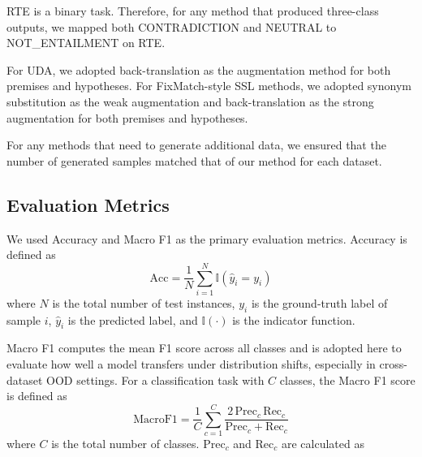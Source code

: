 \documentclass[lettersize,journal]{IEEEtran}
\newif\ifshowcmt
\newcommand{\cmt}[1]{%
	\ifshowcmt
	\textcolor{blue}{/* #1 */}%
	\fi
}
\begin{document}
\cmt{These two paragraphs describe two different uses of LLM prompts in the baseline methods. The first prompt is used for label prediction in ZSL and ICL, where “True”, “False”, and “Neither” correspond to entailment, contradiction, and neutral, respectively. The second prompt is used for data generation in SSL baselines: given an unlabeled premise, the LLM generates an alternative hypothesis that is definitely true, definitely false, or might be true with respect to the premise. These three cases are then mapped to entailment, contradiction, and neutral labels.}

RTE is a binary task. Therefore, for any method that produced three-class outputs, we mapped both CONTRADICTION and NEUTRAL to NOT\_ENTAILMENT on RTE.

For UDA, we adopted back-translation as the augmentation method for both premises and hypotheses. For FixMatch-style SSL methods, we adopted synonym substitution as the weak augmentation and back-translation as the strong augmentation for both premises and hypotheses. 

For any methods that need to generate additional data, we ensured that the number of generated samples matched that of our method for each dataset.

\subsection{Evaluation Metrics}
We used Accuracy and Macro F1 as the primary evaluation metrics. Accuracy is defined as
\begin{equation}
	\text{Acc} = \frac{1}{N}\sum_{i=1}^{N}\mathbb{I}(\hat{y}_i = y_i)
\end{equation}
where $N$ is the total number of test instances, $y_i$ is the ground-truth label of sample $i$, $\hat{y}_i$ is the predicted label, and $\mathbb{I}(\cdot)$ is the indicator function.

Macro F1 computes the mean F1 score across all classes and is adopted here to evaluate how well a model transfers under distribution shifts, especially in cross-dataset OOD settings. For a classification task with $C$ classes, the Macro F1 score is defined as
\begin{equation}
	\text{MacroF1} = \frac{1}{C}\sum_{c=1}^{C} \frac{2\,\text{Prec}_c\,\text{Rec}_c}{\text{Prec}_c+\text{Rec}_c}
\end{equation}
where $C$ is the total number of classes. $\text{Prec}_c$ and $\text{Rec}_c$ are calculated as
\end{document}
